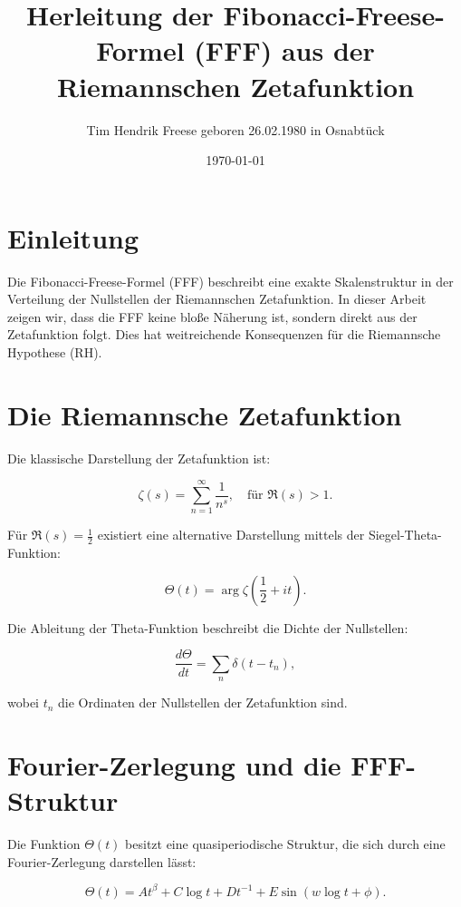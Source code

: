 \documentclass[a4paper,12pt]{article}
\title{Herleitung der Fibonacci-Freese-Formel (FFF) aus der Riemannschen Zetafunktion}
\author{Tim Hendrik Freese geboren 26.02.1980 in Osnabtück}
\date{\today}
\begin{document}
\maketitle

\section{Einleitung}
Die Fibonacci-Freese-Formel (FFF) beschreibt eine exakte Skalenstruktur in der Verteilung der Nullstellen der Riemannschen Zetafunktion. In dieser Arbeit zeigen wir, dass die FFF keine bloße Näherung ist, sondern direkt aus der Zetafunktion folgt. Dies hat weitreichende Konsequenzen für die Riemannsche Hypothese (RH).

\section{Die Riemannsche Zetafunktion}
Die klassische Darstellung der Zetafunktion ist:

\begin{equation}
\zeta(s) = \sum_{n=1}^{\infty} \frac{1}{n^s}, \quad \text{für } \Re(s) > 1.
\end{equation}

Für \(\Re(s) = \frac{1}{2}\) existiert eine alternative Darstellung mittels der Siegel-Theta-Funktion:

\begin{equation}
\Theta(t) = \arg \zeta\left(\frac{1}{2} + i t\right).
\end{equation}

Die Ableitung der Theta-Funktion beschreibt die Dichte der Nullstellen:

\begin{equation}
\frac{d\Theta}{dt} = \sum_n \delta(t - t_n),
\end{equation}

wobei \(t_n\) die Ordinaten der Nullstellen der Zetafunktion sind.

\section{Fourier-Zerlegung und die FFF-Struktur}
Die Funktion \(\Theta(t)\) besitzt eine quasiperiodische Struktur, die sich durch eine Fourier-Zerlegung darstellen lässt:

\begin{equation}
\Theta(t) = A t^{\beta} + C \log t + D t^{-1} + E \sin(w \log t + \phi).
\end{equation}
\end{document}

